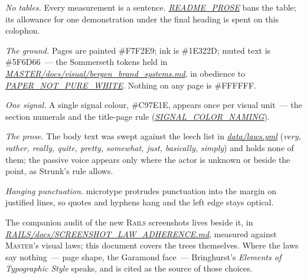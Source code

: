 \documentclass[oneside]{article}
\newcommand{\treename}[1]{\mbox{\textsc{#1}}}
\newcommand{\mtree}{\treename{Master}}
\newcommand{\rtree}{\treename{Rails}}
\newcommand{\fpath}[1]{\emph{\url{#1}}}
\begin{document}
\emph{No tables.} Every measurement is a sentence. \fpath{README_PROSE} bans the table; its allowance for one demonstration under the final heading is spent on this colophon.

\emph{The ground.} Pages are painted \#{F7F2E9}; ink is \#{1E322D}; muted text is \#{5F6D66}~--- the Sommerseth tokens held in \fpath{MASTER/docs/visual/bergen_brand_systems.md}, in obedience to \fpath{PAPER_NOT_PURE_WHITE}. Nothing on any page is \#{FFFFFF}.

\emph{One signal.} A single signal colour, \#{C97E1E}, appears once per visual unit~--- the section numerals and the title-page rule (\fpath{SIGNAL_COLOR_NAMING}).

\emph{The prose.} The body text was swept against the leech list in \fpath{data/laws.yml} (\emph{very, rather, really, quite, pretty, somewhat, just, basically, simply}) and holds none of them; the passive voice appears only where the actor is unknown or beside the point, as Strunk's rule allows.

\emph{Hanging punctuation.} microtype protrudes punctuation into the margin on justified lines, so quotes and hyphens hang and the left edge stays optical.

The companion audit of the new \rtree{} screenshots lives beside it, in \fpath{RAILS/docs/SCREENSHOT_LAW_ADHERENCE.md}, measured against \mtree's visual laws; this document covers the trees themselves. Where the laws say nothing~--- page shape, the Garamond face~--- Bringhurst's \emph{Elements of Typographic Style} speaks, and is cited as the source of those choices.
\end{document}
